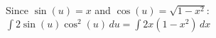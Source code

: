 \documentclass[preview]{standalone}
\begin{document}
\begin{center}
Since $\sin(u) = x$ and $\cos(u) = \sqrt{1 - x^2}$: $\int 2\sin(u)\cos^2(u) \, du = \int 2x(1 - x^2) \, dx$
\end{center}
\end{document}
